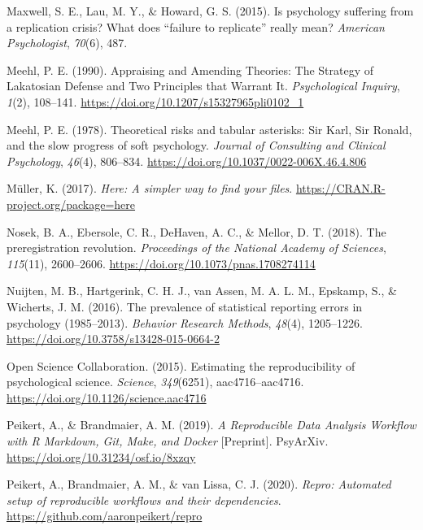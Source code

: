 \documentclass[12pt,a4paper,]{article}
\begin{document}
\leavevmode\hypertarget{ref-maxwellPsychologySufferingReplication2015}{}%
Maxwell, S. E., Lau, M. Y., \& Howard, G. S. (2015). Is psychology suffering from a replication crisis? What does ``failure to replicate'' really mean? \emph{American Psychologist}, \emph{70}(6), 487.

\leavevmode\hypertarget{ref-meehlAppraisingAmendingTheories1990}{}%
Meehl, P. E. (1990). Appraising and Amending Theories: The Strategy of Lakatosian Defense and Two Principles that Warrant It. \emph{Psychological Inquiry}, \emph{1}(2), 108--141. \url{https://doi.org/10.1207/s15327965pli0102_1}

\leavevmode\hypertarget{ref-meehlTheoreticalRisksTabular1978}{}%
Meehl, P. E. (1978). Theoretical risks and tabular asterisks: Sir Karl, Sir Ronald, and the slow progress of soft psychology. \emph{Journal of Consulting and Clinical Psychology}, \emph{46}(4), 806--834. \url{https://doi.org/10.1037/0022-006X.46.4.806}

\leavevmode\hypertarget{ref-R-here}{}%
Müller, K. (2017). \emph{Here: A simpler way to find your files}. \url{https://CRAN.R-project.org/package=here}

\leavevmode\hypertarget{ref-nosekPreregistrationRevolution2018}{}%
Nosek, B. A., Ebersole, C. R., DeHaven, A. C., \& Mellor, D. T. (2018). The preregistration revolution. \emph{Proceedings of the National Academy of Sciences}, \emph{115}(11), 2600--2606. \url{https://doi.org/10.1073/pnas.1708274114}

\leavevmode\hypertarget{ref-nuijtenPrevalenceStatisticalReporting2016}{}%
Nuijten, M. B., Hartgerink, C. H. J., van Assen, M. A. L. M., Epskamp, S., \& Wicherts, J. M. (2016). The prevalence of statistical reporting errors in psychology (1985--2013). \emph{Behavior Research Methods}, \emph{48}(4), 1205--1226. \url{https://doi.org/10.3758/s13428-015-0664-2}

\leavevmode\hypertarget{ref-opensciencecollaborationEstimatingReproducibilityPsychological2015}{}%
Open Science Collaboration. (2015). Estimating the reproducibility of psychological science. \emph{Science}, \emph{349}(6251), aac4716--aac4716. \url{https://doi.org/10.1126/science.aac4716}

\leavevmode\hypertarget{ref-peikertReproducibleDataAnalysis2019}{}%
Peikert, A., \& Brandmaier, A. M. (2019). \emph{A Reproducible Data Analysis Workflow with R Markdown, Git, Make, and Docker} {[}Preprint{]}. PsyArXiv. \url{https://doi.org/10.31234/osf.io/8xzqy}

\leavevmode\hypertarget{ref-R-repro}{}%
Peikert, A., Brandmaier, A. M., \& van Lissa, C. J. (2020). \emph{Repro: Automated setup of reproducible workflows and their dependencies}. \url{https://github.com/aaronpeikert/repro}
\end{document}
